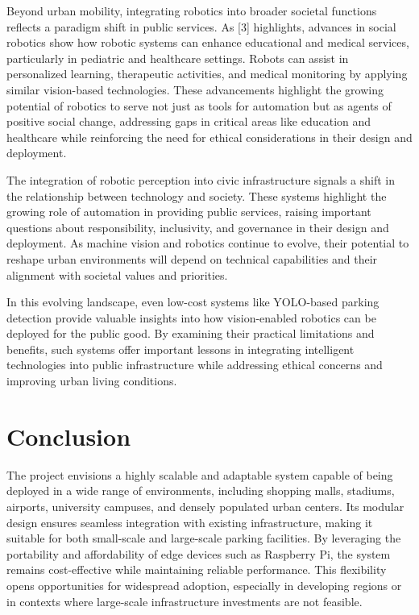 \documentclass[conference]{IEEEtran}
\begin{document}
Beyond urban mobility, 
integrating robotics into broader societal functions reflects a paradigm shift in public services. 
As [3] highlights, 
advances in social robotics show how robotic systems can enhance educational and medical services, 
particularly in pediatric and healthcare settings. 
Robots can assist in personalized learning, 
therapeutic activities, 
and medical monitoring by applying similar vision-based technologies. 
These advancements highlight the growing potential of robotics to serve not just as tools for automation but as agents of positive social change, 
addressing gaps in critical areas like education and healthcare while reinforcing the need for ethical considerations in their design and deployment.

The integration of robotic perception into civic infrastructure signals a shift in the relationship between technology and society. 
These systems highlight the growing role of automation in providing public services, 
raising important questions about responsibility, 
inclusivity, 
and governance in their design and deployment. 
As machine vision and robotics continue to evolve, 
their potential to reshape urban environments will depend on technical capabilities and their alignment with societal values and priorities.

In this evolving landscape, 
even low-cost systems like YOLO-based parking detection provide valuable insights into how vision-enabled robotics can be deployed for the public good. 
By examining their practical limitations and benefits, 
such systems offer important lessons in integrating intelligent technologies into public infrastructure while addressing ethical concerns and improving urban living conditions.

\section{Conclusion}

The project envisions a highly scalable and adaptable system capable of being deployed in a wide range of environments, 
including shopping malls, 
stadiums, 
airports, 
university campuses, 
and densely populated urban centers. 
Its modular design ensures seamless integration with existing infrastructure, 
making it suitable for both small-scale and large-scale parking facilities. 
By leveraging the portability and affordability of edge devices such as Raspberry Pi, 
the system remains cost-effective while maintaining reliable performance. 
This flexibility opens opportunities for widespread adoption, 
especially in developing regions or in contexts where large-scale infrastructure investments are not feasible.
\end{document}
